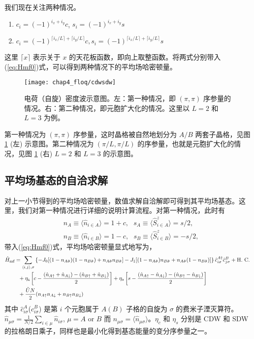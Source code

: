 我们现在关注两种情况。
\begin{enumerate}
    \item $c_i=(-1)^{i_x+i_y}c$, $s_i=(-1)^{i_x+i_y}s$
    \item $c_i=(-1)^{\lceil i_x/L \rceil + \lceil i_y/L \rceil}c, s_i=(-1)^{\lceil i_x/L \rceil + \lceil i_y/L \rceil}s$  
\end{enumerate}
这里 $\lceil x \rceil$ 表示关于 $x$ 的天花板函数，即向上取整函数。将两式分别带入(\ref{eq:Hmf0})式，可以得到两种情况下的平均场哈密顿量。

\begin{figure}[!htb]
\centering
\texttt{[image: chap4\_floq/cdwsdw]}
\caption{电荷（自旋）密度波示意图。左：第一种情况，即 $(\pi,\pi)$ 序参量的情况。右：第二种情况，即元胞扩大化的情况。这里以 $L=2$ 和 $L=3$ 为例。}\label{fig:floq:cdwsdw}
\end{figure}

第一种情况为 $(\pi,\pi)$ 序参量\cite{nagaosa}，这时晶格被自然地划分为 $A/B$ 两套子晶格，见图 \ref{fig:floq:cdwsdw} (左) 示意图。第二种情况为 $(\pi/L,\pi/L)$ 的序参量，也就是元胞扩大化的情况，见图 \ref{fig:floq:cdwsdw} (右) $L=2$ 和 $L=3$ 的示意图。


\subsection{平均场基态的自洽求解}
对上一小节得到的平均场哈密顿量，数值求解自洽解即可得到其平均场基态。这里，我们对第一种情况进行详细的说明计算流程。对第一种情况，此时有
\begin{align}
    &n_A\equiv\langle \hat{n}_{i\in A} \rangle = 1 + c , \  \  \
    s_A\equiv\langle \hat{S}_{i\in A}^{z} \rangle = s/2,\label{order1} \\
    &n_B\equiv\langle \hat{n}_{i\in B} \rangle = 1 - c , \  \  \
    s_B\equiv\langle \hat{S}_{i\in B}^{z} \rangle = -s/2,\label{order2}
\end{align}
带入(\ref{eq:Hmf0})式，平均场哈密顿量显式地写为，
\begin{align}\label{eq:Hmf}
    \hat{H}_{\text{mf}} &= \sum_{\langle i,j\rangle,\sigma} \left\{-J_0[(1-n_{A\bar{\sigma}})(1-n_{B\bar{\sigma}})+n_{A\bar{\sigma}}n_{B\bar{\sigma}}] - J_1[(1-n_{A\bar{\sigma}})n_{B\bar{\sigma}}+n_{A\bar{\sigma}}(1-n_{B\bar{\sigma}})]\right\}\hat{c}_{i\sigma}^{A\dagger}\hat{c}_{j\sigma}^B+ \text{H. C. } \notag \\
    & \  \  + \eta_c \left[c-\frac{(\hat{n}_{A\uparrow}+\hat{n}_{A\downarrow}) - (\hat{n}_{B\uparrow}+\hat{n}_{B\downarrow})}{2}\right] 
    + \eta_s \left[s-\frac{(\hat{n}_{A\uparrow}-\hat{n}_{A\downarrow}) - (\hat{n}_{B\uparrow}-\hat{n}_{B\downarrow})}{2}\right] \notag \\
    & \  \  + \frac{\tilde{U}N}{2}(n_{A\uparrow}n_{A\downarrow} + n_{B\uparrow}n_{B\downarrow}) 
\end{align}
其中 $\hat{c}_{i\sigma}^A$($\hat{c}_{i\sigma}^B$) 是第 $i$ 个元胞属于 $A(B)$ 子格的自旋为 $\sigma$ 的费米子湮灭算符。$\hat{n}_{\mu\sigma} = \frac{1}{N/2}\sum_{i\in\mu}\hat{n}_{i\sigma}$, $\mu = A$ or $B$ 而 $n_{\mu\sigma} = \langle\hat{n}_{\mu\sigma}\rangle$。$\eta_c$ 和 $\eta_s$ 分别是 CDW 和 SDW 的拉格朗日乘子，同样也是最小化得到基态能量的变分序参量之一。

